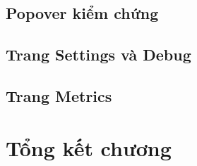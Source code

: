 \subsection{Popover kiểm chứng}

\subsection{Trang Settings và Debug}

\subsection{Trang Metrics}

\section{Tổng kết chương}
